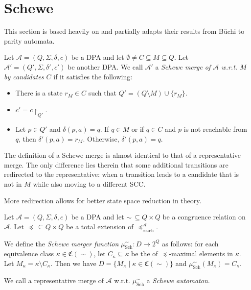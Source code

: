 
\section{Schewe}
\label{sect:schewe}

This section is based heavily on \cite{Schewe2010} and partially adapts their results from B\"uchi to parity automata.

\begin{defn}
		Let $\mathcal{A} = (Q, \Sigma, \delta, c)$ be a DPA and let $\emptyset \neq C \subseteq M \subseteq Q$. Let $\mathcal{A}' = (Q', \Sigma, \delta', c')$ be another DPA. We call $\mathcal{A}'$ a \emph{Schewe merge of $\mathcal{A}$ w.r.t. $M$ by candidates $C$} if it satisfies the following:
	\begin{itemize}
		\item There is a state $r_M \in C$ such that $Q' = (Q \setminus M) \cup \{r_M\}$.
		\item $c' = c\upharpoonright_{Q'}$.
		\item Let $p \in Q'$ and $\delta(p, a) = q$. If $q \in M$ or if $q \in C$ and $p$ is not reachable from $q$, then $\delta'(p, a) = r_M$. Otherwise, $\delta'(p, a) = q$. 
	\end{itemize}
\end{defn}

The definition of a Schewe merge is almost identical to that of a representative merge. The only difference lies therein that some additional transitions are redirected to the representative: when a transition leads to a candidate that is not in $M$ while also moving to a different SCC.

More redirection allows for better state space reduction in theory. 




\begin{defn}
	Let $\mathcal{A} = (Q, \Sigma, \delta, c)$ be a DPA and let $\sim \,\subseteq Q \times Q$ be a congruence relation on $\mathcal{A}$. Let $\preceq \,\subseteq Q \times Q$ be a total extension of $\preceq_\text{reach}^\mathcal{A}$. 
	
	We define the \emph{Schewe merger function} $\mu_\text{Sch}^\sim : D \rightarrow 2^Q$ as follows: for each equivalence class $\kappa \in \mathfrak{C}(\sim)$, let $C_\kappa \subseteq \kappa$ be the of $\preceq$-maximal elements in $\kappa$. Let $M_\kappa = \kappa \setminus C_\kappa$. Then we have $D = \{ M_\kappa \mid \kappa \in \mathfrak{C}(\sim) \}$ and $\mu_\text{Sch}^\sim(M_\kappa) = C_\kappa$.
	
	We call a representative merge of $\mathcal{A}$ w.r.t. $\mu_\text{Sch}^\sim$ a \emph{Schewe automaton}.
\end{defn}

